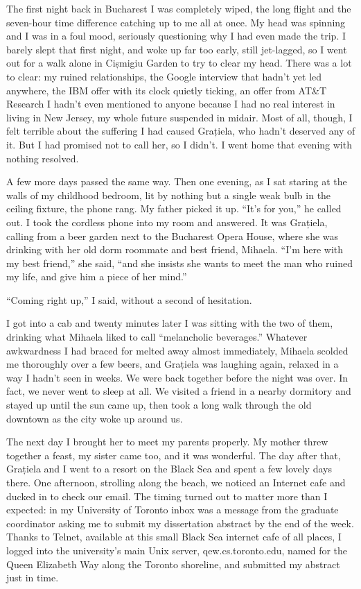 \documentclass[12pt]{book}
\begin{document}
The first night back in Bucharest I was completely wiped, the long
flight and the seven-hour time difference catching up to me all at once.
My head was spinning and I was in a foul mood, seriously questioning why
I had even made the trip. I barely slept that first night, and woke up
far too early, still jet-lagged, so I went out for a walk alone in
Cișmigiu Garden to try to clear my head. There was a lot to clear: my
ruined relationships, the Google interview that hadn't yet led anywhere,
the IBM offer with its clock quietly ticking, an offer from AT\&T
Research I hadn't even mentioned to anyone because I had no real
interest in living in New Jersey, my whole future suspended in midair.
Most of all, though, I felt terrible about the suffering I had caused
Grațiela, who hadn't deserved any of it. But I had promised not to call
her, so I didn't. I went home that evening with nothing resolved.

A few more days passed the same way. Then one evening, as I sat staring
at the walls of my childhood bedroom, lit by nothing but a single weak
bulb in the ceiling fixture, the phone rang. My father picked it up.
``It's for you,'' he called out. I took the cordless phone into my room
and answered. It was Grațiela, calling from a beer garden next to the
Bucharest Opera House, where she was drinking with her old dorm roommate
and best friend, Mihaela. ``I'm here with my best friend,'' she said,
``and she insists she wants to meet the man who ruined my life, and give
him a piece of her mind.''

``Coming right up,'' I said, without a second of hesitation.

I got into a cab and twenty minutes later I was sitting with the two of
them, drinking what Mihaela liked to call ``melancholic beverages.''
Whatever awkwardness I had braced for melted away almost immediately,
Mihaela scolded me thoroughly over a few beers, and Grațiela was
laughing again, relaxed in a way I hadn't seen in weeks. We were back
together before the night was over. In fact, we never went to sleep at
all. We visited a friend in a nearby dormitory and stayed up until the
sun came up, then took a long walk through the old downtown as the city
woke up around us.

The next day I brought her to meet my parents properly. My mother threw
together a feast, my sister came too, and it was wonderful. The day
after that, Grațiela and I went to a resort on the Black Sea and spent a
few lovely days there. One afternoon, strolling along the beach, we
noticed an Internet cafe and ducked in to check our email. The timing
turned out to matter more than I expected: in my University of Toronto
inbox was a message from the graduate coordinator asking me to submit my
dissertation abstract by the end of the week. Thanks to Telnet,
available at this small Black Sea internet cafe of all places, I logged
into the university's main Unix server, qew.cs.toronto.edu, named for
the Queen Elizabeth Way along the Toronto shoreline, and submitted my
abstract just in time.
\end{document}
